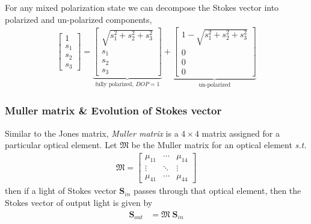 \documentclass[11pt,a4paper]{article}
\numberwithin{equation}{section}
\begin{document}
For any mixed polarization state we can decompose the Stokes vector into polarized and un-polarized components,
\begin{align}
	\begin{bmatrix} 1\\ s_1\\ s_2\\ s_3\end{bmatrix} = 
	\underbrace{\begin{bmatrix} \sqrt{s_1^2+s_2^2+s_3^2}\\ s_1\\ s_2\\ s_3\end{bmatrix}}_{\text{fully polarized, } DOP = 1} +
	\underbrace{\begin{bmatrix} 1-\sqrt{s_1^2+s_2^2+s_3^2}\\0\\ 0\\ 0\end{bmatrix}}_{\text{un-polarized}}
\end{align}

\subsubsection{Muller matrix \& Evolution of Stokes vector}

Similar to the Jones matrix, \textit{Muller matrix} is a $4\times4$ matrix assigned for a particular optical element. Let $\boldsymbol{\mathfrak{M}}$ be the Muller matrix for an optical element \textit{s.t.} 
\begin{align*}\boldsymbol{\mathfrak{M}}=
	\begin{bmatrix}
		\mu_{11} & \cdots & \mu_{14}\\
		\vdots & \ddots & \vdots\\
		\mu_{41} & \cdots & \mu_{44}
	\end{bmatrix}
\end{align*}
then if a light of Stokes vector $\boldsymbol{S}_{in}$ passes through that optical element, then the Stokes vector of output light is given by 
\begin{align}
	\boldsymbol{S}_{out}&=\boldsymbol{\mathfrak{M}}\;\boldsymbol{S}_{in}\label{eq:1.33}
\end{align}
\end{document}
